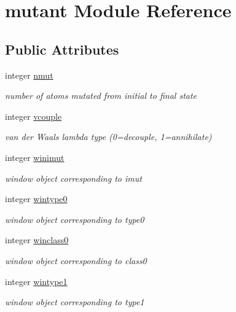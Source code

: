 \hypertarget{classmutant}{\section{mutant Module Reference}
\label{classmutant}
}
\subsection*{Public Attributes}
\begin{DoxyCompactItemize}
\item 
integer \hyperlink{classmutant_a3d601d8dbb74b427005f7a8ffade0b8b}{nmut}
\begin{DoxyCompactList}\small\item\em number of atoms mutated from initial to final state \end{DoxyCompactList}\item 
integer \hyperlink{classmutant_a15145ccb3bf4a6c9120785ac8a2f42b0}{vcouple}
\begin{DoxyCompactList}\small\item\em van der Waals lambda type (0=decouple, 1=annihilate) \end{DoxyCompactList}\item 
integer \hyperlink{classmutant_a01da112336651cd662fc2199857d9a2f}{winimut}
\begin{DoxyCompactList}\small\item\em window object corresponding to imut \end{DoxyCompactList}\item 
integer \hyperlink{classmutant_ad540d3dcb17e0e3dcd4674743672942b}{wintype0}
\begin{DoxyCompactList}\small\item\em window object corresponding to type0 \end{DoxyCompactList}\item 
integer \hyperlink{classmutant_aea9b816b3d0450deccd506db35f6824a}{winclass0}
\begin{DoxyCompactList}\small\item\em window object corresponding to class0 \end{DoxyCompactList}\item 
integer \hyperlink{classmutant_a210d11cc8e127e58049730c9383c3e01}{wintype1}
\begin{DoxyCompactList}\small\item\em window object corresponding to type1 \end{DoxyCompactList}\item 

\end{DoxyCompactItemize}
